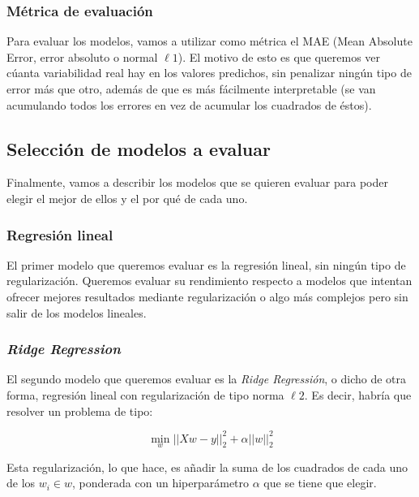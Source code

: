 \documentclass[11pt,a4paper]{article}
\begin{document}
\subsubsection{Métrica de evaluación}\label{muxe9trica-de-evaluaciuxf3n}

Para evaluar los modelos, vamos a utilizar como métrica el MAE (Mean
Absolute Error, error absoluto o normal \(\ell 1\)). El motivo de esto
es que queremos ver cúanta variabilidad real hay en los valores
predichos, sin penalizar ningún tipo de error más que otro, además de
que es más fácilmente interpretable (se van acumulando todos los errores
en vez de acumular los cuadrados de éstos).

    \subsection{Selección de modelos a
evaluar}\label{selecciuxf3n-de-modelos-a-evaluar}

Finalmente, vamos a describir los modelos que se quieren evaluar para
poder elegir el mejor de ellos y el por qué de cada uno.

\subsubsection{Regresión lineal}\label{regresiuxf3n-lineal}

El primer modelo que queremos evaluar es la regresión lineal, sin ningún
tipo de regularización. Queremos evaluar su rendimiento respecto a
modelos que intentan ofrecer mejores resultados mediante regularización
o algo más complejos pero sin salir de los modelos lineales.

\subsubsection{\texorpdfstring{\emph{Ridge
Regression}}{Ridge Regression}}\label{ridge-regression}

El segundo modelo que queremos evaluar es la \emph{Ridge Regressión}, o
dicho de otra forma, regresión lineal con regularización de tipo norma
\(\ell 2\). Es decir, habría que resolver un problema de tipo:

\begin{equation}
\min_{w} || X w - y||_2^2 + \alpha ||w||_2^2
\end{equation}

Esta regularización, lo que hace, es añadir la suma de los cuadrados de
cada uno de los \(w_i \in w\), ponderada con un hiperparámetro
\(\alpha\) que se tiene que elegir.
\end{document}
